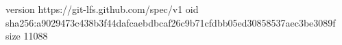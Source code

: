 version https://git-lfs.github.com/spec/v1
oid sha256:a9029473c438b3f44dafcaebdbcaf26c9b71cfdbb05ed30858537aec3be3089f
size 11088
